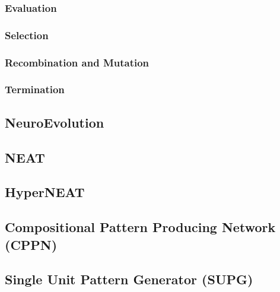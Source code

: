 \documentclass[11pt, a4paper]{article}
\begin{document}
\subsubsection{Evaluation}

\subsubsection{Selection}
\subsubsection{Recombination and Mutation}
\subsubsection{Termination}
\subsection{NeuroEvolution}
\subsection{NEAT}
\subsection{HyperNEAT}
\subsection{Compositional Pattern Producing Network (CPPN)}
\subsection{Single Unit Pattern Generator (SUPG)}
\end{document}

